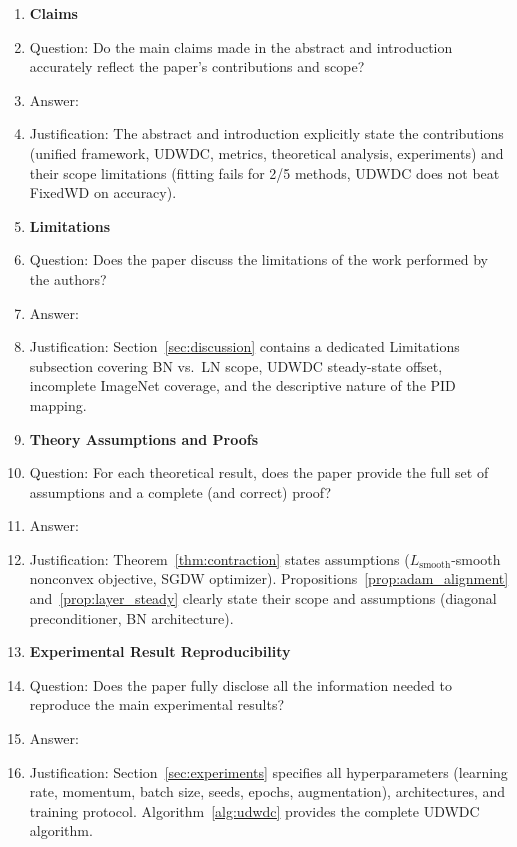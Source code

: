 \documentclass{article}
\begin{document}
\begin{enumerate}

\item {\bf Claims}
    \item[] Question: Do the main claims made in the abstract and introduction accurately reflect the paper's contributions and scope?
    \item[] Answer: \answerYes{}
    \item[] Justification: The abstract and introduction explicitly state the contributions (unified framework, UDWDC, metrics, theoretical analysis, experiments) and their scope limitations (fitting fails for 2/5 methods, UDWDC does not beat FixedWD on accuracy).

\item {\bf Limitations}
    \item[] Question: Does the paper discuss the limitations of the work performed by the authors?
    \item[] Answer: \answerYes{}
    \item[] Justification: Section~\ref{sec:discussion} contains a dedicated Limitations subsection covering BN vs.\ LN scope, UDWDC steady-state offset, incomplete ImageNet coverage, and the descriptive nature of the PID mapping.

\item {\bf Theory Assumptions and Proofs}
    \item[] Question: For each theoretical result, does the paper provide the full set of assumptions and a complete (and correct) proof?
    \item[] Answer: \answerYes{}
    \item[] Justification: Theorem~\ref{thm:contraction} states assumptions ($L_{\text{smooth}}$-smooth nonconvex objective, SGDW optimizer). Propositions~\ref{prop:adam_alignment} and~\ref{prop:layer_steady} clearly state their scope and assumptions (diagonal preconditioner, BN architecture).

\item {\bf Experimental Result Reproducibility}
    \item[] Question: Does the paper fully disclose all the information needed to reproduce the main experimental results?
    \item[] Answer: \answerYes{}
    \item[] Justification: Section~\ref{sec:experiments} specifies all hyperparameters (learning rate, momentum, batch size, seeds, epochs, augmentation), architectures, and training protocol. Algorithm~\ref{alg:udwdc} provides the complete UDWDC algorithm.


\end{enumerate}
\end{document}
